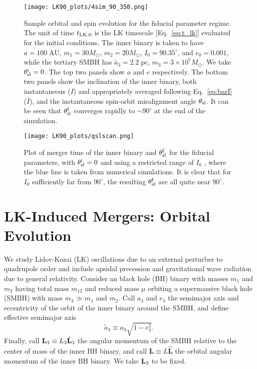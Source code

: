 \documentclass[
        twocolumn,
        twocolappendix
    ]{aastex63}
\renewcommand*{\bm}[1]{\boldsymbol{\mathbf{#1}}}
\newcommand*{\uv}[1]{\hat{\bm{#1}}}
\begin{document}
\begin{figure}
    \centering
    \texttt{[image: LK90\_plots/4sim\_90\_350.png]}
    \caption{Sample orbital and spin evolution for the fiducial parameter
    regime. The unit of time $t_{\rm LK, 0}$ is the LK timescale
    [Eq.~\eqref{eq:t_lk}] evaluated for the initial conditions. The inner binary
    is taken to have $a = 100\;\mathrm{AU}$, $m_1 = 30M_{\odot}$, $m_2 =
    20M_{\odot}$, $I_0 = 90.35^\circ$, and $e_0 = 0.001$, while the tertiary
    SMBH has $\tilde{a}_3 = 2.2\;\mathrm{pc}$, $m_3 = 3 \times 10^7 M_{\odot}$.
    We take $\theta_{\rm sl}^{\rm i} = 0$. The top two panels show $a$ and $e$
    respectively. The bottom two panels show the inclination of the inner
    binary, both instantaneous ($I$) and appropriately averaged following
    Eq.~\eqref{eq:barI} ($\bar{I}$), and the instantaneous spin-orbit
    misalignment angle $\theta_{\rm sl}$. It can be seen that $\theta_{\rm
    sl}^{\rm f}$ converges rapidly to $\sim 90^\circ$ at the end of the
    simulation.}\label{fig:4sim_90_350}
\end{figure}
\begin{figure}
    \centering
    \texttt{[image: LK90\_plots/qslscan.png]}
    \caption{Plot of merger time of the inner binary and $\theta_{\rm sl}^{\rm
    f}$ for the fiducial parameters, with $\theta_{\rm sl}^{\rm
    i} = 0$ and using a restricted range of $I_0$ \citep[analogous to the
    bottom-most panel in Fig.~3 of][]{bin2}, where the blue line is taken from
    numerical simulations. It is clear that for $I_0$ sufficiently far from
    $90^\circ$, the resulting $\theta_{\rm sl}^{\rm f}$ are all quite near
    $90^\circ$\citep{bin2}.}\label{fig:qslscan}
\end{figure}

\section{LK-Induced Mergers: Orbital Evolution}\label{s:setup_orbital}

We study Lidov-Kozai (LK) oscillations due to an external perturber to
quadrupole order and include apsidal precession and gravitational wave
radiation due to general relativity. Consider an black hole (BH) binary
with masses $m_1$ and $m_2$ having total mass $m_{12}$ and reduced mass $\mu$
orbiting a supermassive black hole (SMBH) with mass $m_3 \gg m_1$ and $m_2$.
Call $a_3$ and $e_3$ the semimajor axis and eccentricity of the orbit of the
inner binary around the SMBH, and define effective semimajor axis
\begin{equation}
    \tilde{a}_3 \equiv a_3\sqrt{1 - e_3^2}.
\end{equation}
Finally, call $\bm{L}_{\rm 3} \equiv L_{\rm 3} \uv{L}_{\rm 3}$ the angular
momentum of the SMBH relative to the center of mass of the inner BH binary, and
call $\bm{L} \equiv L \uv{L}$ the orbital angular momentum of the inner BH
binary. We take $\bm{L}_{\rm 3}$ to be fixed.
\end{document}
